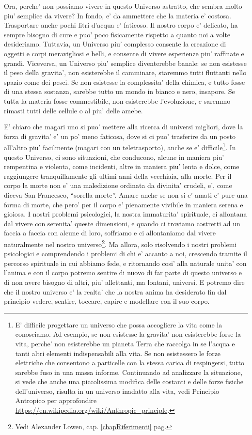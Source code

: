 Ora, perche' non possiamo vivere in questo Universo astratto, che sembra molto piu' semplice da vivere? In fondo, e' da ammettere che la materia e' costosa. Trasportare anche pochi litri d'acqua e' faticoso. Il nostro corpo e' delicato, ha sempre bisogno di cure e puo' poco fisicamente rispetto a quanto noi a volte desideriamo. Tuttavia, un Universo piu' complesso consente la creazione di oggetti e corpi meravigliosi e belli, e consente di vivere esperienze piu' raffinate e grandi. Viceversa, un Universo piu' semplice diventerebbe banale: se non esistesse il peso della gravita', non esisterebbe il camminare, staremmo tutti fluttanti nello spazio come dei pesci. Se non esistesse la complessita' della chimica, e tutto fosse di una stessa sostanza, sarebbe tutto un mondo in bianco e nero, insapore. Se tutta la materia fosse commestibile, non esisterebbe l'evoluzione, e saremmo rimasti tutti delle cellule o al piu' delle amebe. 

E' chiaro che magari uno si puo' mettere alla ricerca di universi migliori, dove la forza di gravita' e' un po' meno faticosa, dove si ci puo' trasferire da un posto all'altro piu' facilmente (magari con un teletrasporto), anche se e' difficile\footnote{
E' difficile progettare un universo che possa accogliere la vita come la conosciamo. Ad esempio, se non esistesse la gravita' non esisterebbe forse la vita, perche' non esisterebbe un pianeta Terra che raccolga in se l'acqua e tanti altri elementi indispensabili alla vita. Se non esistessero le forze elettriche che consentono a particelle con la stessa carica di respingersi, tutto sarebbe fuso in una massa informe. Continuando ad analizzare la situazione, si vede che anche una piccolissima modifica delle costanti e delle forze fisiche dell'universo, risulta in un universo inadatto alla vita, vedi Principio Antropico per approfondire \url{https://en.wikipedia.org/wiki/Anthropic\_principle}.
}.
In questo Universo, ci sono situazioni, che conducono, alcune in maniera piu' rempentina e violenta, come incidenti, altre in maniera piu' lenta e dolce, come raggiungere tranquillamente gli ultimi anni della vecchiaia, alla morte. Per il corpo la morte non e' una maledizione ordinata da divinita' crudeli, e', come diceva San Francesco, ``sorella morte''. Amare anche se non si e' amati e' pure una forma di morte, che pero' per il corpo e' pienamente vivibile in maniera serena e gioiosa. I nostri problemi psicologici, la nostra immaturita' spirituale, ci allontana dal vivere con serenita' queste dimensioni, e quando ci troviamo costretti ad un faccia a faccia con alcune di loro, soffriamo e ci allontaniamo dal vivere naturalmente nel nostro universo\footnote{Vedi Alexander Lowen, cap. \ref{chapRiferimenti} pag. \pageref{chapRiferimenti}}.
Ma allora, solo risolvendo i nostri problemi psicologici e comprendendo i problemi di chi e' accanto a noi, crescendo tramite il percorso spirituale in cui abbiamo fede, e ritornando cosi' alla naturale unita' con l'anima e con il corpo potremo sentire di nuovo di far parte di questo universo e di non avere bisogno di altri, piu' allettanti, ma lontani, universi. E potremo dire che il nostro universo e' la realta' che la nostra anima ha desiderato fin dal principio vedere, sentire, toccare, capire e modellare con il suo corpo.

